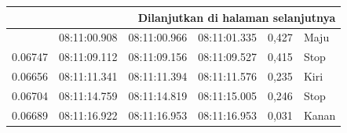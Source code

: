 \begin{longtable}{|l|l|l|l|l|l|}
  \hline \multicolumn{6}{r}{{Dilanjutkan di halaman selanjutnya}} \\ \hline
  \endfoot
  
  \hline \hline
  \endlastfoot

   \hline
  0.17112                                                                                                 & 08:11:00.908                                                                                           & 08:11:00.966                                                                                               & 08:11:01.335                                                                                            & 0,427                                              & Maju                                              \\ \hline
  0.06747                                                                                                 & 08:11:09.112                                                                                           & 08:11:09.156                                                                                               & 08:11:09.527                                                                                            & 0,415                                              & Stop                                              \\ \hline
  0.06656                                                                                                 & 08:11:11.341                                                                                           & 08:11:11.394                                                                                               & 08:11:11.576                                                                                            & 0,235                                              & Kiri                                              \\ \hline
  0.06704                                                                                                 & 08:11:14.759                                                                                           & 08:11:14.819                                                                                               & 08:11:15.005                                                                                            & 0,246                                              & Stop                                              \\ \hline
  0.06689                                                                                                 & 08:11:16.922                                                                                           & 08:11:16.953                                                                                               & 08:11:16.953                                                                                            & 0,031                                              & Kanan                                             \\ \hline

\end{longtable}
